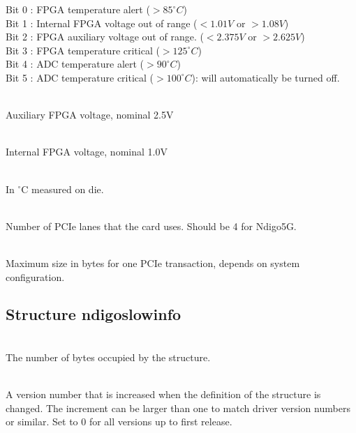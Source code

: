             \noindent Bit 0 : FPGA temperature alert ($> 85^{\circ}C$)\\
            Bit 1 : Internal FPGA voltage out of range ($< 1.01V$ or $> 1.08V$)\\
            Bit 2 : FPGA auxiliary voltage out of range. ($< 2.375V$ or $>  2.625V$)\\
            Bit 3 : FPGA temperature critical ($> 125^{\circ}C$)\\
            Bit 4 : ADC temperature alert ($> 90^{\circ}C$)\\
            Bit 5 : ADC temperature critical ($> 100^{\circ}C$): will automatically be turned off.\par

            \\
            Auxiliary FPGA voltage, nominal 2.5V\par

            \\
            Internal FPGA voltage, nominal 1.0V\par

            \\
            In $^\circ$C measured on die.\par

            \\
            Number of PCIe lanes that the card uses. Should be 4 for Ndigo5G. \par

            \\
            Maximum size in bytes for one PCIe transaction, depends on system configuration.\par

        \subsection{Structure ndigo\tu slow\tu info}

            \\
            The number of bytes occupied by the structure.\par

            \\
            A version number that is increased when the definition of the structure is changed. The increment can be larger than one to match driver version numbers or similar. Set to 0 for all versions up to
first release.\par

